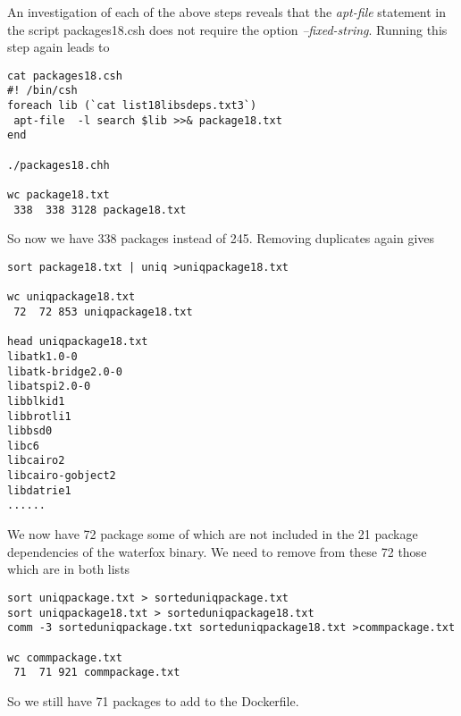 \documentclass{article}  %
\begin{document}
An investigation of each of the above steps reveals that the {\em apt-file} statement in the script packages18.csh does not require the option {\em --fixed-string}. Running this step again leads to

\begin{verbatim}
cat packages18.csh
#! /bin/csh
foreach lib (`cat list18libsdeps.txt3`)
 apt-file  -l search $lib >>& package18.txt
end

./packages18.chh

wc package18.txt
 338  338 3128 package18.txt

\end{verbatim}
So now we have 338 packages instead of 245. Removing duplicates again gives
\begin{verbatim}
sort package18.txt | uniq >uniqpackage18.txt

wc uniqpackage18.txt
 72  72 853 uniqpackage18.txt

head uniqpackage18.txt
libatk1.0-0
libatk-bridge2.0-0
libatspi2.0-0
libblkid1
libbrotli1
libbsd0
libc6
libcairo2
libcairo-gobject2
libdatrie1
......
\end{verbatim}

We now have 72 package some of which  are not included in  the 21  package dependencies of the waterfox binary. We need to remove from these 72 those which are  in both lists
\begin{verbatim}
sort uniqpackage.txt > sorteduniqpackage.txt
sort uniqpackage18.txt > sorteduniqpackage18.txt
comm -3 sorteduniqpackage.txt sorteduniqpackage18.txt >commpackage.txt

wc commpackage.txt
 71  71 921 commpackage.txt
\end{verbatim}
So we still have 71 packages to add to the Dockerfile.
\end{document}
